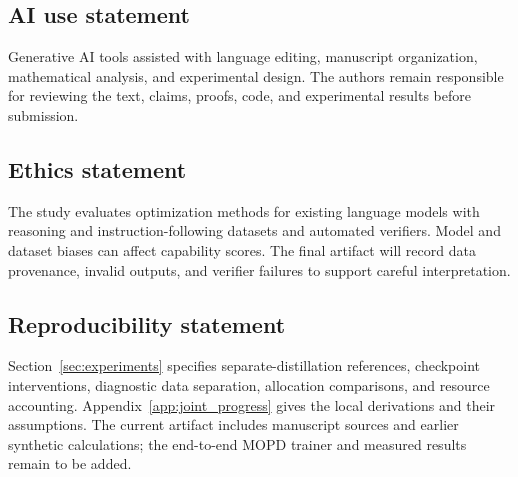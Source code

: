 \subsection*{AI use statement}

Generative AI tools assisted with language editing, manuscript organization,
mathematical analysis, and experimental design.
The authors remain responsible for reviewing the text, claims, proofs, code,
and experimental results before submission.

\subsection*{Ethics statement}

The study evaluates optimization methods for existing language models with
reasoning and instruction-following datasets and automated verifiers. Model and
dataset biases can affect capability scores. The final artifact will record data
provenance, invalid outputs, and verifier failures to support careful
interpretation.

\subsection*{Reproducibility statement}

Section~\ref{sec:experiments} specifies separate-distillation references,
checkpoint interventions, diagnostic data separation, allocation comparisons,
and resource accounting. Appendix~\ref{app:joint_progress} gives the local
derivations and their assumptions. The current artifact includes manuscript
sources and earlier synthetic calculations; the end-to-end MOPD trainer
and measured results remain to be added.
